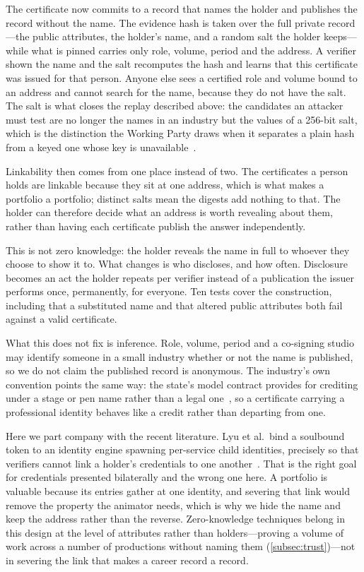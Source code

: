 The certificate now commits to a record that names the holder and publishes the
record without the name. The evidence hash is taken over the full private
record---the public attributes, the holder's name, and a random salt the holder
keeps---while what is pinned carries only role, volume, period and the address.
A verifier shown the name and the salt recomputes the hash and learns that this
certificate was issued for that person. Anyone else sees a certified role and
volume bound to an address and cannot search for the name, because they do not
have the salt. The salt is what closes the replay described above: the candidates an
attacker must test are no longer the names in an industry but the values of a
256-bit salt, which is the distinction the Working Party draws when it separates a
plain hash from a keyed one whose key is unavailable~\cite{art29wp2014anonymisation}.

Linkability then comes from one place instead of two. The certificates a person
holds are linkable because they sit at one address, which is what makes a
portfolio a portfolio; distinct salts mean the digests add nothing to that. The
holder can therefore decide what an address is worth revealing about them, rather
than having each certificate publish the answer independently.

This is not zero knowledge: the holder reveals the name in full to whoever they
choose to show it to. What changes is who discloses, and how often. Disclosure becomes
an act the holder repeats per verifier instead of a publication the issuer performs
once, permanently, for everyone. Ten tests cover the construction, including that a
substituted name and that altered public attributes both fail against a valid
certificate.

What this does not fix is inference. Role, volume, period and a co-signing studio may
identify someone in a small industry whether or not the name is published, so we do not
claim the published record is anonymous. The industry's own convention points the same
way: the state's model contract provides for crediting under a stage or pen name rather
than a legal one~\cite{bunka2024model}, so a certificate carrying a professional
identity behaves like a credit rather than departing from one.

Here we part company with the recent literature. Lyu et al.\ bind a soulbound token to
an identity engine spawning per-service child identities, precisely so that verifiers
cannot link a holder's credentials to one another~\cite{lyu2026ssi}. That is the right
goal for credentials presented bilaterally and the wrong one here. A portfolio is
valuable because its entries gather at one identity, and severing that link would remove
the property the animator needs, which is why we hide the name and keep the address
rather than the reverse. Zero-knowledge techniques belong in this design at the level of
attributes rather than holders---proving a volume of work across a number of productions
without naming them (\cref{subsec:trust})---not in severing the link that makes a career
record a record.

